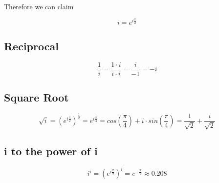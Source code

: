 \documentclass[a4paper]{article}
\begin{document}
Therefore we can claim
\begin{definition}
$$i = e^{i\frac{\pi}{2}} $$
\end{definition}

\subsection{Reciprocal}
\begin{equation}
\frac{1}{i} = \frac{1 \cdot i}{i \cdot i} = \frac{i}{-1} =-i
\end{equation}


\subsection{Square Root}
\begin{equation}
\sqrt{i} = (e^{i\frac{\pi}{2}})^{\frac{1}{2}} = e^{i\frac{\pi}{4}} = cos(\frac{\pi}{4}) + i \cdot sin(\frac{\pi}{4}) = \frac{1}{\sqrt{2}} + \frac{i}{\sqrt{2}}
\end{equation}

\subsection{i to the power of i}
\begin{equation}
i^i = (e^{i\frac{\pi}{2}})^{i} = e^{-\frac{\pi}{2}} \approx 0.208
\end{equation}
\end{document}

